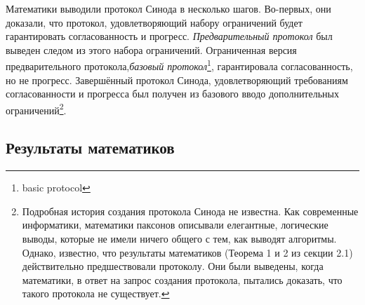 Математики выводили протокол Синода в несколько шагов. Во-первых, они доказали, что протокол, удовлетворяющий набору ограничений будет гарантировать согласованность  и прогресс. \textit{Предварительный протокол} был выведен следом из этого набора ограничений. Ограниченная  версия предварительного протокола,\textit{базовый протокол}\footnote{basic protocol}, гарантировала согласованность, но не прогресс. Завершённый протокол Синода, удовлетворяющий требованиям согласованности и прогресса был получен из базового вводо дополнительных ограничений\footnote{
    Подробная история создания протокола Синода не известна. Как современные информатики, математики паксонов описывали елегантные, логические выводы, которые не имели ничего общего с тем, как выводят алгоритмы. Однако, известно, что результаты математиков (Теорема 1 и 2 из секции 2.1) действительно предшествовали протоколу. Они были выведены, когда математики, в ответ на запрос создания протокола, пытались доказать, что такого протокола не существует.
}.

\subsection{Результаты математиков}

